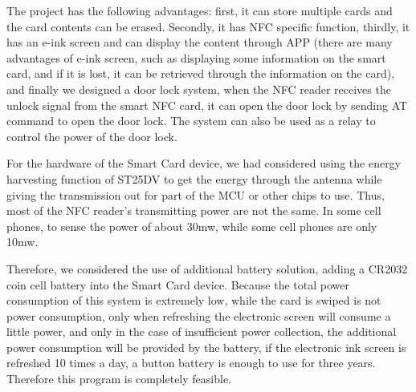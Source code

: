 \documentclass[11pt, a4paper]{article}
\begin{document}
The project has the following advantages: first, it can store multiple cards and the card contents can be erased. Secondly, it has NFC specific function, thirdly, it has an e-ink screen and can display the content through APP (there are many advantages of e-ink screen, such as displaying some information on the smart card, and if it is lost, it can be retrieved through the information on the card), and finally we designed a door lock system, when the NFC reader receives the unlock signal from the smart NFC card, it can open the door lock by sending AT command to open the door lock. The system can also be used as a relay to control the power of the door lock.

For the hardware of the Smart Card device, we had considered using the energy harvesting function of ST25DV to get the energy through the antenna while giving the transmission out for part of the MCU or other chips to use. Thus, most of the NFC reader's transmitting power are not the same. In some cell phones, to sense the power of about 30mw, while some cell phones are only 10mw.

Therefore, we considered the use of additional battery solution, adding a CR2032 coin cell battery into the Smart Card device. Because the total power consumption of this system is extremely low, while the card is swiped is not power consumption, only when refreshing the electronic screen will consume a little power, and only in the case of insufficient power collection, the additional power consumption will be provided by the battery, if the electronic ink screen is refreshed 10 times a day, a button battery is enough to use for three years. Therefore this program is completely feasible.


\nocite{*}
\printbibliography
\end{document}
